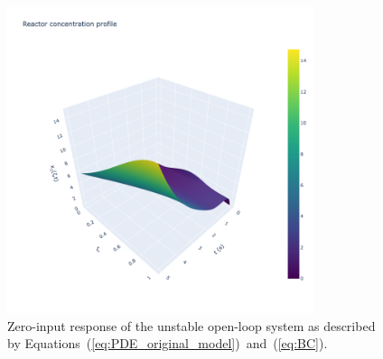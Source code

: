 \begin{figure}[!htbp]
    \centering
    \includegraphics[width=0.8\textwidth,trim=0 0 100 0,clip]{Figures/3D_x1_openloop.png}
    \caption{Zero-input response of the unstable open-loop system as described by Equations~(\ref{eq:PDE_original_model})~and~(\ref{eq:BC}).}
    \label{fig:3D_x1_openloop}
\end{figure}

